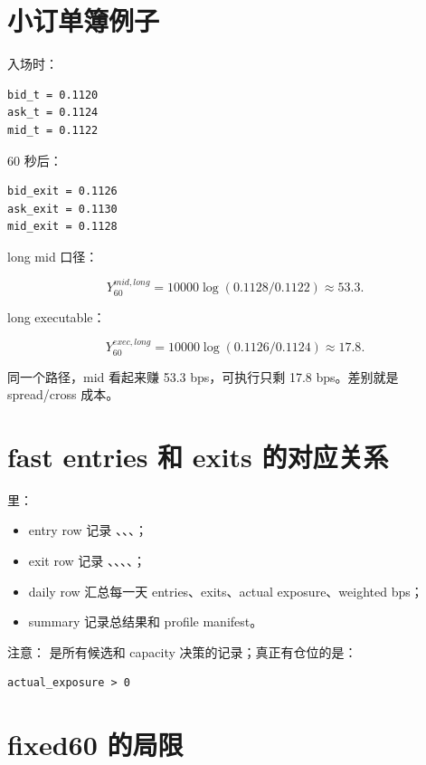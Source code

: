 \section{小订单簿例子}

入场时：

\begin{lstlisting}
bid_t = 0.1120
ask_t = 0.1124
mid_t = 0.1122
\end{lstlisting}

60 秒后：

\begin{lstlisting}
bid_exit = 0.1126
ask_exit = 0.1130
mid_exit = 0.1128
\end{lstlisting}

long mid 口径：

\[
Y^{mid,long}_{60}
=10000\log(0.1128/0.1122)
\approx 53.3.
\]

long executable：

\[
Y^{exec,long}_{60}
=10000\log(0.1126/0.1124)
\approx 17.8.
\]

同一个路径，mid 看起来赚 53.3 bps，可执行只剩 17.8 bps。差别就是 spread/cross 成本。

\section{fast entries 和 exits 的对应关系}

 里：

\begin{itemize}[leftmargin=2em]
  \item entry row 记录 、、、；
  \item exit row 记录 、、、、；
  \item daily row 汇总每一天 entries、exits、actual exposure、weighted bps；
  \item summary 记录总结果和 profile manifest。
\end{itemize}

注意： 是所有候选和 capacity 决策的记录；真正有仓位的是：

\begin{lstlisting}
actual_exposure > 0
\end{lstlisting}

\section{fixed60 的局限}


